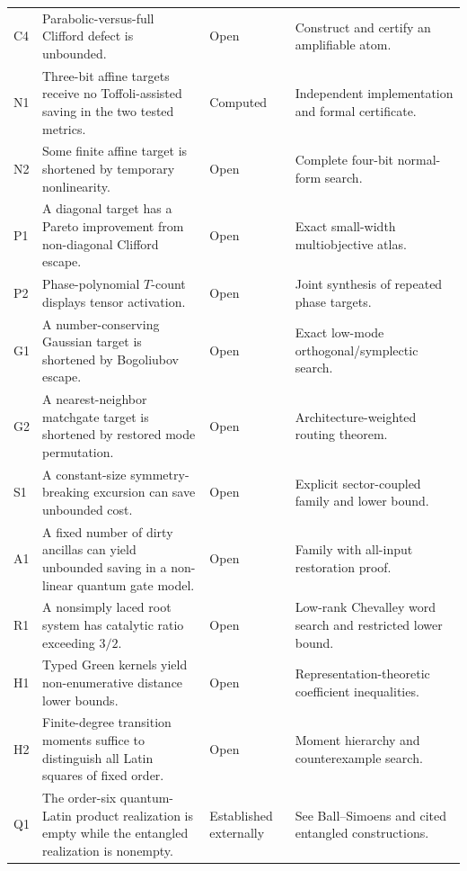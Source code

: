 \begin{longtable}{@{}>{\raggedright\arraybackslash}p{}>{\raggedright\arraybackslash}p{}>{\raggedright\arraybackslash}p{}>{\raggedright\arraybackslash}p{}@{}}
C4 & Parabolic-versus-full Clifford defect is unbounded. & Open & Construct and certify an amplifiable atom.\\
N1 & Three-bit affine targets receive no Toffoli-assisted saving in the two tested metrics. & Computed & Independent implementation and formal certificate.\\
N2 & Some finite affine target is shortened by temporary nonlinearity. & Open & Complete four-bit normal-form search.\\
P1 & A diagonal target has a Pareto improvement from non-diagonal Clifford escape. & Open & Exact small-width multiobjective atlas.\\
P2 & Phase-polynomial $T$-count displays tensor activation. & Open & Joint synthesis of repeated phase targets.\\
G1 & A number-conserving Gaussian target is shortened by Bogoliubov escape. & Open & Exact low-mode orthogonal/symplectic search.\\
G2 & A nearest-neighbor matchgate target is shortened by restored mode permutation. & Open & Architecture-weighted routing theorem.\\
S1 & A constant-size symmetry-breaking excursion can save unbounded cost. & Open & Explicit sector-coupled family and lower bound.\\
A1 & A fixed number of dirty ancillas can yield unbounded saving in a non-linear quantum gate model. & Open & Family with all-input restoration proof.\\
R1 & A nonsimply laced root system has catalytic ratio exceeding $3/2$. & Open & Low-rank Chevalley word search and restricted lower bound.\\
H1 & Typed Green kernels yield non-enumerative distance lower bounds. & Open & Representation-theoretic coefficient inequalities.\\
H2 & Finite-degree transition moments suffice to distinguish all Latin squares of fixed order. & Open & Moment hierarchy and counterexample search.\\
Q1 & The order-six quantum-Latin product realization is empty while the entangled realization is nonempty. & Established externally & See Ball--Simoens and cited entangled constructions.\\
\bottomrule
\end{longtable}

